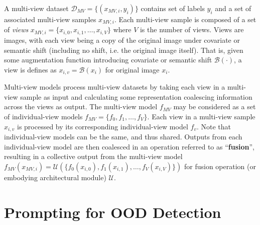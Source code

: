 %
A multi-view dataset $\mathcal{D}_{MV} = \{(x_{MV,i}, y_i)\}$ contains set of labels $y_i$ and a set of associated multi-view samples $x_{MV,i}$. Each multi-view sample is composed of a set of \emph{views} $x_{MV,i} = \{x_{i,0}, x_{i,1}, \dots, x_{i,V}\}$ where $V$ is the number of views. Views are images, with each view being a copy of the original image under covariate or semantic shift (including no shift, i.e. the original image itself). That is, given some augmentation function introducing covariate or semantic shift $\mathcal{B}(\cdot)$, a view is defines as $x_{i,v} = \mathcal{B}(x_i)$ for original image $x_i$.%

Multi-view models process multi-view datasets by taking each view in a multi-view sample as input and calculating some representation coalescing information across the views as output. The multi-view model $f_{MV}$ may be considered as a set of individual-view models $f_{MV} = \{f_0, f_1, \dots, f_V\}$. Each view in a multi-view sample $x_{i,v}$ is processed by its corresponding individual-view model $f_v$. Note that  individual-view models can be the same, and thus shared. Outputs from each individual-view model are then coalesced in an operation referred to as ``\textbf{fusion}'', resulting in a collective output from the multi-view model $f_{MV}(x_{MV,i}) = \mathcal{U}(\{f_0(x_{i,0}),f_1(x_{i,1}),\dots,f_V(x_{i,V})\})$ for fusion operation (or embodying architectural module) $\mathcal{U}$.

\section{Prompting for OOD Detection}

